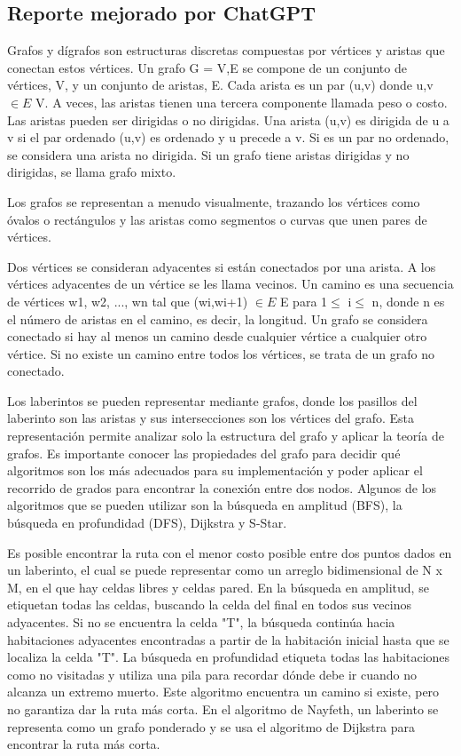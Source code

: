 \subsection*{Reporte mejorado por ChatGPT}
	\noindent Grafos y dígrafos son estructuras discretas compuestas por vértices y aristas que conectan estos vértices. Un grafo G = {V,E} se compone de un conjunto de vértices, V, y un conjunto de aristas, E. Cada arista es un par (u,v) donde u,v  $ \in E$ V. A veces, las aristas tienen una tercera componente llamada peso o costo. Las aristas pueden ser dirigidas o no dirigidas. Una arista (u,v) es dirigida de u a v si el par ordenado (u,v) es ordenado y u precede a v. Si es un par no ordenado, se considera una arista no dirigida. Si un grafo tiene aristas dirigidas y no dirigidas, se llama grafo mixto.
	
	Los grafos se representan a menudo visualmente, trazando los vértices como óvalos o rectángulos y las aristas como segmentos o curvas que unen pares de vértices.
	
	Dos vértices se consideran adyacentes si están conectados por una arista. A los vértices adyacentes de un vértice se les llama vecinos. Un camino es una secuencia de vértices w1, w2, ..., wn tal que (wi,wi+1)  $ \in E$ E para  1$\le$ i$\le$ n, donde n es el número de aristas en el camino, es decir, la longitud. Un grafo se considera conectado si hay al menos un camino desde cualquier vértice a cualquier otro vértice. Si no existe un camino entre todos los vértices, se trata de un grafo no conectado.
	
	Los laberintos se pueden representar mediante grafos, donde los pasillos del laberinto son las aristas y sus intersecciones son los vértices del grafo. Esta representación permite analizar solo la estructura del grafo y aplicar la teoría de grafos. Es importante conocer las propiedades del grafo para decidir qué algoritmos son los más adecuados para su implementación y poder aplicar el recorrido de grados para encontrar la conexión entre dos nodos. Algunos de los algoritmos que se pueden utilizar son la búsqueda en amplitud (BFS), la búsqueda en profundidad (DFS), Dijkstra y S-Star.
	
	Es posible encontrar la ruta con el menor costo posible entre dos puntos dados en un laberinto, el cual se puede representar como un arreglo bidimensional de N x M, en el que hay celdas libres y celdas pared. En la búsqueda en amplitud, se etiquetan todas las celdas, buscando la celda del final en todos sus vecinos adyacentes. Si no se encuentra la celda "T", la búsqueda continúa hacia habitaciones adyacentes encontradas a partir de la habitación inicial hasta que se localiza la celda "T". La búsqueda en profundidad etiqueta todas las habitaciones como no visitadas y utiliza una pila para recordar dónde debe ir cuando no alcanza un extremo muerto. Este algoritmo encuentra un camino si existe, pero no garantiza dar la ruta más corta. En el algoritmo de Nayfeth, un laberinto se representa como un grafo ponderado y se usa el algoritmo de Dijkstra para encontrar la ruta más corta.

